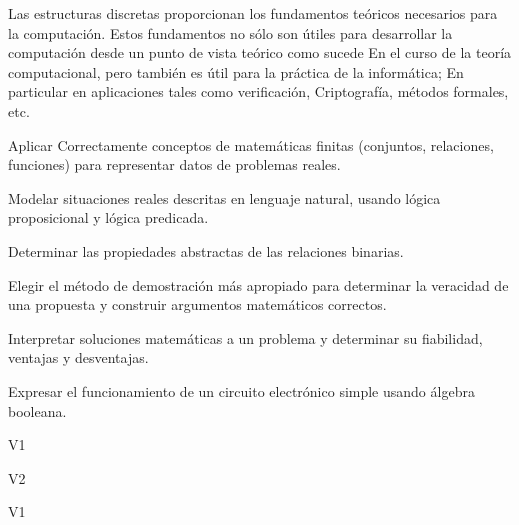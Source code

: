 \begin{syllabus}


\begin{justification}
Las estructuras discretas proporcionan los fundamentos teóricos necesarios para la computación. Estos fundamentos no sólo son útiles para desarrollar la computación desde un punto de vista teórico como sucede
En el curso de la teoría computacional, pero también es útil para la práctica de la informática; En particular en aplicaciones tales como verificación,
Criptografía, métodos formales, etc.
\end{justification}

\begin{goals}
\item Aplicar Correctamente conceptos de matemáticas finitas (conjuntos, relaciones, funciones) para representar datos de problemas reales.
\item Modelar situaciones reales descritas en lenguaje natural, usando lógica proposicional y lógica predicada.
\item Determinar las propiedades abstractas de las relaciones binarias.
\item Elegir el método de demostración más apropiado para determinar la veracidad de una propuesta y construir argumentos matemáticos correctos.
\item Interpretar soluciones matemáticas a un problema y determinar su fiabilidad, ventajas y desventajas.
\item Expresar el funcionamiento de un circuito electrónico simple usando álgebra booleana.
\end{goals}

\begin{outcomes}{V1}
    \item {}
    \item {}
\end{outcomes}

\begin{outcomes}{V2}
    \item {}
    \item {}
\end{outcomes}

\begin{competences}{V1}
    \item {}
    \item {}
\end{competences}


\end{syllabus}
